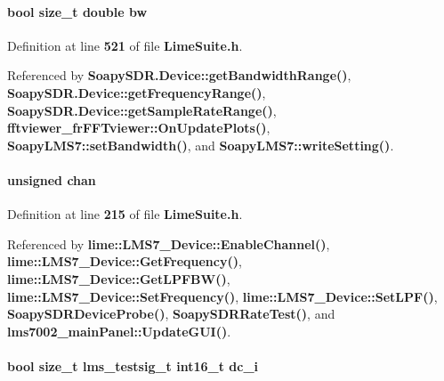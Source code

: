 \paragraph[{bw}]{\setlength{\rightskip}{0pt plus 5cm}bool size\+\_\+t double bw}\label{group__FN__HIGH__LVL_ga72fb354f0be1ddb0d4833e33819f9a00}


Definition at line {\bf 521} of file {\bf Lime\+Suite.\+h}.



Referenced by {\bf Soapy\+S\+D\+R.\+Device\+::get\+Bandwidth\+Range()}, {\bf Soapy\+S\+D\+R.\+Device\+::get\+Frequency\+Range()}, {\bf Soapy\+S\+D\+R.\+Device\+::get\+Sample\+Rate\+Range()}, {\bf fftviewer\+\_\+fr\+F\+F\+Tviewer\+::\+On\+Update\+Plots()}, {\bf Soapy\+L\+M\+S7\+::set\+Bandwidth()}, and {\bf Soapy\+L\+M\+S7\+::write\+Setting()}.

\paragraph[{chan}]{\setlength{\rightskip}{0pt plus 5cm}unsigned chan}\label{group__FN__HIGH__LVL_gafeb55c5de97f9ab2ccf6de9b3144ccfc}


Definition at line {\bf 215} of file {\bf Lime\+Suite.\+h}.



Referenced by {\bf lime\+::\+L\+M\+S7\+\_\+\+Device\+::\+Enable\+Channel()}, {\bf lime\+::\+L\+M\+S7\+\_\+\+Device\+::\+Get\+Frequency()}, {\bf lime\+::\+L\+M\+S7\+\_\+\+Device\+::\+Get\+L\+P\+F\+B\+W()}, {\bf lime\+::\+L\+M\+S7\+\_\+\+Device\+::\+Set\+Frequency()}, {\bf lime\+::\+L\+M\+S7\+\_\+\+Device\+::\+Set\+L\+P\+F()}, {\bf Soapy\+S\+D\+R\+Device\+Probe()}, {\bf Soapy\+S\+D\+R\+Rate\+Test()}, and {\bf lms7002\+\_\+main\+Panel\+::\+Update\+G\+U\+I()}.

\paragraph[{dc\+\_\+i}]{\setlength{\rightskip}{0pt plus 5cm}bool size\+\_\+t {\bf lms\+\_\+testsig\+\_\+t} int16\+\_\+t dc\+\_\+i}\label{group__FN__HIGH__LVL_gadb235d08b497acd79d23d37db020fbb3}


